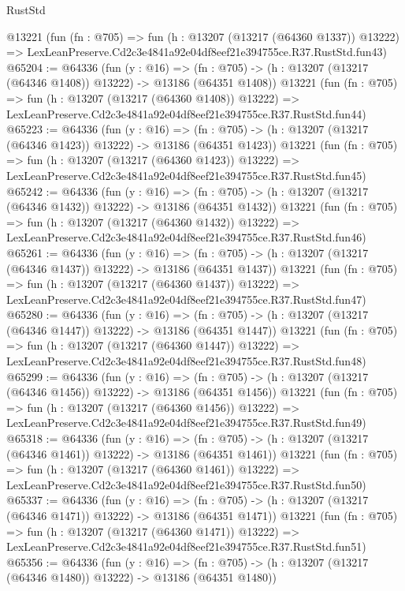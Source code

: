 \begin{lexlean}{RustStd}
\begin{coremodule}
    @13221
    (fun (fn : @705) =>
    fun (h : @13207 (@13217 (@64360 @1337)) @13222) =>
    LexLeanPreserve.Cd2c3e4841a92e04df8eef21e394755ce.R37.RustStd.fun43)
@65204 := @64336
    (fun (y : @16) =>
    (fn : @705) -> (h : @13207 (@13217 (@64346 @1408)) @13222) -> @13186 (@64351 @1408))
    @13221
    (fun (fn : @705) =>
    fun (h : @13207 (@13217 (@64360 @1408)) @13222) =>
    LexLeanPreserve.Cd2c3e4841a92e04df8eef21e394755ce.R37.RustStd.fun44)
@65223 := @64336
    (fun (y : @16) =>
    (fn : @705) -> (h : @13207 (@13217 (@64346 @1423)) @13222) -> @13186 (@64351 @1423))
    @13221
    (fun (fn : @705) =>
    fun (h : @13207 (@13217 (@64360 @1423)) @13222) =>
    LexLeanPreserve.Cd2c3e4841a92e04df8eef21e394755ce.R37.RustStd.fun45)
@65242 := @64336
    (fun (y : @16) =>
    (fn : @705) -> (h : @13207 (@13217 (@64346 @1432)) @13222) -> @13186 (@64351 @1432))
    @13221
    (fun (fn : @705) =>
    fun (h : @13207 (@13217 (@64360 @1432)) @13222) =>
    LexLeanPreserve.Cd2c3e4841a92e04df8eef21e394755ce.R37.RustStd.fun46)
@65261 := @64336
    (fun (y : @16) =>
    (fn : @705) -> (h : @13207 (@13217 (@64346 @1437)) @13222) -> @13186 (@64351 @1437))
    @13221
    (fun (fn : @705) =>
    fun (h : @13207 (@13217 (@64360 @1437)) @13222) =>
    LexLeanPreserve.Cd2c3e4841a92e04df8eef21e394755ce.R37.RustStd.fun47)
@65280 := @64336
    (fun (y : @16) =>
    (fn : @705) -> (h : @13207 (@13217 (@64346 @1447)) @13222) -> @13186 (@64351 @1447))
    @13221
    (fun (fn : @705) =>
    fun (h : @13207 (@13217 (@64360 @1447)) @13222) =>
    LexLeanPreserve.Cd2c3e4841a92e04df8eef21e394755ce.R37.RustStd.fun48)
@65299 := @64336
    (fun (y : @16) =>
    (fn : @705) -> (h : @13207 (@13217 (@64346 @1456)) @13222) -> @13186 (@64351 @1456))
    @13221
    (fun (fn : @705) =>
    fun (h : @13207 (@13217 (@64360 @1456)) @13222) =>
    LexLeanPreserve.Cd2c3e4841a92e04df8eef21e394755ce.R37.RustStd.fun49)
@65318 := @64336
    (fun (y : @16) =>
    (fn : @705) -> (h : @13207 (@13217 (@64346 @1461)) @13222) -> @13186 (@64351 @1461))
    @13221
    (fun (fn : @705) =>
    fun (h : @13207 (@13217 (@64360 @1461)) @13222) =>
    LexLeanPreserve.Cd2c3e4841a92e04df8eef21e394755ce.R37.RustStd.fun50)
@65337 := @64336
    (fun (y : @16) =>
    (fn : @705) -> (h : @13207 (@13217 (@64346 @1471)) @13222) -> @13186 (@64351 @1471))
    @13221
    (fun (fn : @705) =>
    fun (h : @13207 (@13217 (@64360 @1471)) @13222) =>
    LexLeanPreserve.Cd2c3e4841a92e04df8eef21e394755ce.R37.RustStd.fun51)
@65356 := @64336
    (fun (y : @16) =>
    (fn : @705) -> (h : @13207 (@13217 (@64346 @1480)) @13222) -> @13186 (@64351 @1480))

\end{coremodule}
\end{lexlean}
